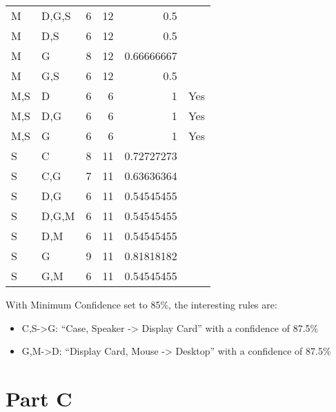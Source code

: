 \documentclass[10pt]{article}
\begin{document}
\begin{table}[htb]
\begin{center}
\begin{tabular}{llrrrl}
 M      &  D,G,S  &          6  &         12  &                    0.5  &                \\
 M      &  D,S    &          6  &         12  &                    0.5  &                \\
 M      &  G      &          8  &         12  &             0.66666667  &                \\
 M      &  G,S    &          6  &         12  &                    0.5  &                \\
 M,S    &  D      &          6  &          6  &                      1  &  Yes           \\
 M,S    &  D,G    &          6  &          6  &                      1  &  Yes           \\
 M,S    &  G      &          6  &          6  &                      1  &  Yes           \\
 S      &  C      &          8  &         11  &             0.72727273  &                \\
 S      &  C,G    &          7  &         11  &             0.63636364  &                \\
 S      &  D,G    &          6  &         11  &             0.54545455  &                \\
 S      &  D,G,M  &          6  &         11  &             0.54545455  &                \\
 S      &  D,M    &          6  &         11  &             0.54545455  &                \\
 S      &  G      &          9  &         11  &             0.81818182  &                \\
 S      &  G,M    &          6  &         11  &             0.54545455  &                \\
\end{tabular}
\end{center}
\end{table}


With Minimum Confidence set to 85\%, the interesting rules are:
\begin{itemize}
\item C,S->G: ``Case, Speaker -> Display Card'' with a confidence of 87.5\%
\item G,M->D: ``Display Card, Mouse -> Desktop'' with a confidence of 87.5\%
\end{itemize}
\section{Part C}
\label{sec-3}
\end{document}
